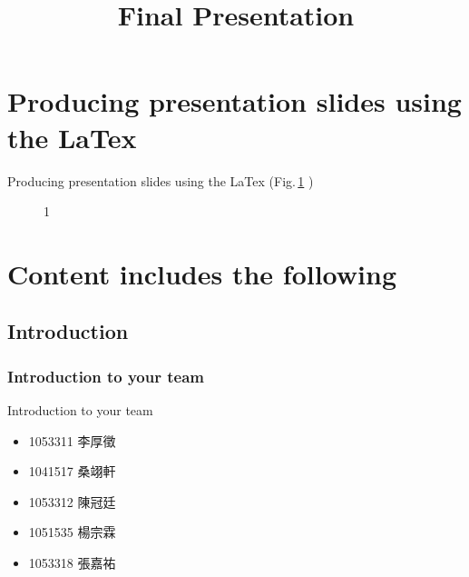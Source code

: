 \documentclass{beamer}
\title{Final Presentation}
\begin{document}
\begin{frame}
  \titlepage
\end{frame}



   \tableofcontents






\section{Producing presentation slides using the LaTex \medskip}
\begin{frame}{Producing presentation slides using the LaTex}
	(Fig.\,\ref{fig:1} )
    \begin{figure}
    \caption{1}
    \label{fig:1}
  \end{figure}
\end{frame}


\section{Content includes the following }

\subsection{Introduction}

\subsubsection{Introduction to your team}
\begin{frame}{Introduction to your team}
\begin{itemize}
  \item  \begin{CJK}{UTF8}{bkai}1053311 李厚徵\end{CJK}
  \item  \begin{CJK}{UTF8}{bkai}1041517 桑翊軒\end{CJK}
  \item \begin{CJK}{UTF8}{bkai}1053312 陳冠廷\end{CJK}
  \item  \begin{CJK}{UTF8}{bkai}1051535 楊宗霖\end{CJK}
  \item  \begin{CJK}{UTF8}{bkai}1053318 張嘉祐\end{CJK}
\end{itemize}
\end{frame}
\end{document}
